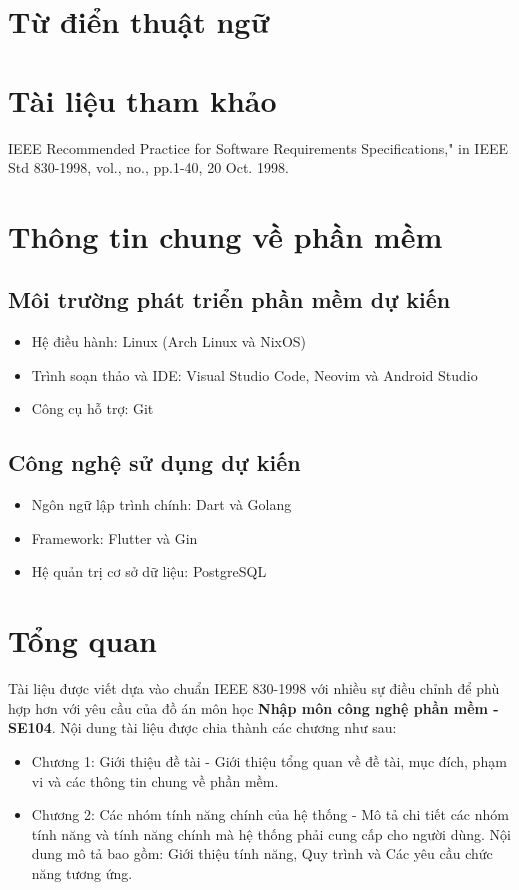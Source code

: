 \section{Từ điển thuật ngữ}

\section{Tài liệu tham khảo}

\begin{thebibliography}{9}
  IEEE Recommended Practice for Software Requirements Specifications," in IEEE Std 830-1998, vol., no., pp.1-40, 20 Oct. 1998.

\end{thebibliography}

\section{Thông tin chung về phần mềm}

\subsection{Môi trường phát triển phần mềm dự kiến}

\begin{itemize}
  \item Hệ điều hành: Linux (Arch Linux và NixOS)
  \item Trình soạn thảo và IDE: Visual Studio Code, Neovim và Android Studio
  \item Công cụ hỗ trợ: Git
\end{itemize}

\subsection{Công nghệ sử dụng dự kiến}

\begin{itemize}
  \item Ngôn ngữ lập trình chính: Dart và Golang
  \item Framework: Flutter và Gin
  \item Hệ quản trị cơ sở dữ liệu: PostgreSQL
\end{itemize}

\section{Tổng quan}

Tài liệu được viết dựa vào chuẩn IEEE 830-1998 \cite{IEEE830} với nhiều sự điều chỉnh để phù hợp hơn với yêu cầu của đồ án môn học \textbf{Nhập môn công nghệ phần mềm - SE104}. Nội dung tài liệu được chia thành các chương như sau:
\begin{itemize}
  \item Chương 1: Giới thiệu đề tài - Giới thiệu tổng quan về đề tài, mục đích, phạm vi và các thông tin chung về phần mềm.
  \item Chương 2: Các nhóm tính năng chính của hệ thống - Mô tả chi tiết các nhóm tính năng và tính năng chính mà hệ thống phải cung cấp cho người dùng. Nội dung mô tả bao gồm: Giới thiệu tính năng, Quy trình và Các yêu cầu chức năng tương ứng.
\end{itemize}